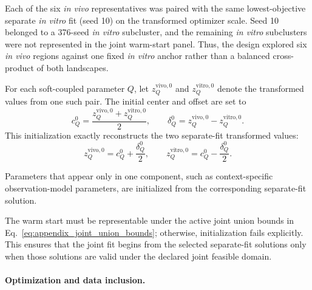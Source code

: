 \documentclass[11pt]{article}
\begin{document}
Each of the six \textit{in vivo} representatives was paired with the same lowest-objective separate \textit{in vitro} fit (seed 10) on the transformed optimizer scale. Seed 10 belonged to a 376-seed \textit{in vitro} subcluster, and the remaining \textit{in vitro} subclusters were not represented in the joint warm-start panel. Thus, the design explored six \textit{in vivo} regions against one fixed \textit{in vitro} anchor rather than a balanced cross-product of both landscapes.

For each soft-coupled parameter $Q$, let $z_Q^{\mathrm{vivo},0}$ and $z_Q^{\mathrm{vitro},0}$ denote the transformed values from one such pair. The initial center and offset are set to
\begin{equation}
c_Q^{0} = \frac{z_Q^{\mathrm{vivo},0} + z_Q^{\mathrm{vitro},0}}{2}, \qquad \delta_Q^{0} = z_Q^{\mathrm{vivo},0} - z_Q^{\mathrm{vitro},0}.
\label{eq:appendix_joint_warm_start_soft}
\end{equation}
This initialization exactly reconstructs the two separate-fit transformed values:
\[
z_Q^{\mathrm{vivo},0} = c_Q^0+\frac{\delta_Q^0}{2}, \qquad z_Q^{\mathrm{vitro},0} = c_Q^0-\frac{\delta_Q^0}{2}.
\]

Parameters that appear only in one component, such as context-specific observation-model parameters, are initialized from the corresponding separate-fit solution.

The warm start must be representable under the active joint union bounds in Eq.~\eqref{eq:appendix_joint_union_bounds}; otherwise, initialization fails explicitly. This ensures that the joint fit begins from the selected separate-fit solutions only when those solutions are valid under the declared joint feasible domain.


\paragraph{Optimization and data inclusion.}
\end{document}
